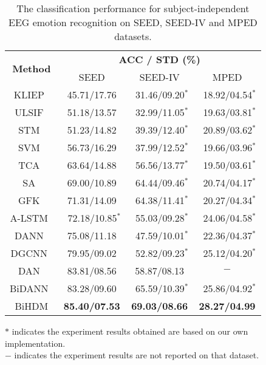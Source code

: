 \documentclass[journal]{IEEEtran}
\begin{document}
\begin{table}[htb]
	\caption{The classification performance for subject-independent EEG emotion recognition on SEED, SEED-IV and MPED datasets.}
	\centering
	\renewcommand{\arraystretch}{1.3}
	\begin{threeparttable}		
		\begin{tabular}{|c|c|c|c|}
			\hline
			\multirow{2}{*}{\textbf{Method}} & \multicolumn{3}{c|}{\textbf{ACC / STD (\%)}} \\ \cline{2-4}
			                        &    SEED         & SEED-IV        & MPED\\ \hline
			KLIEP~\cite{sugiyama2008direct}           & 45.71/17.76     &~31.46/09.20$^*$&~18.92/04.54$^*$\\ \hline
            ULSIF~\cite{kanamori2009least}            & 51.18/13.57     &~32.99/11.05$^*$&~19.63/03.81$^*$\\ \hline
            STM~\cite{chu2017selective}               & 51.23/14.82     &~39.39/12.40$^*$&~20.89/03.62$^*$\\ \hline
			SVM~\cite{suykens1999least}               &   56.73/16.29   &~37.99/12.52$^*$&~19.66/03.96$^*$\\ \hline
			TCA~\cite{pan2011domain}                  &   63.64/14.88   &~56.56/13.77$^*$&~19.50/03.61$^*$\\ \hline
			SA~\cite{fernando2013unsupervised}        &   69.00/10.89   &~64.44/09.46$^*$&~20.74/04.17$^*$\\ \hline
			GFK~\cite{gong2012geodesic}               &   71.31/14.09   &~64.38/11.41$^*$&~20.27/04.34$^*$\\ \hline
			A-LSTM~\cite{8606087} 				      &~72.18/10.85$^*$ &~55.03/09.28$^*$&~24.06/04.58$^*$\\ \hline
			DANN~\cite{ganin2016domain}               &   75.08/11.18   &~47.59/10.01$^*$&~22.36/04.37$^*$\\ \hline
			DGCNN~\cite{song2018eeg}                  &   79.95/09.02   &~52.82/09.23$^*$&~25.12/04.20$^*$\\ \hline
			DAN~\cite{li2018cross}                    &   83.81/08.56   & 58.87/08.13    &  $-$           \\ \hline
			BiDANN~\cite{li2018novel}                 &   83.28/09.60   &~65.59/10.39$^*$&~25.86/04.92$^*$\\ \hline
			BiHDM                   &\textbf{85.40/07.53}&\textbf{69.03/08.66}&\textbf{28.27/04.99}   \\ \hline
		\end{tabular}
		\begin{tablenotes}[para]
			\footnotesize $*$ indicates the experiment results obtained are based on our own implementation.\\
			$-$ indicates the experiment results are not reported on that dataset.
		\end{tablenotes}
	\end{threeparttable}
	\label{Table: ind}
\end{table}
\end{document}
